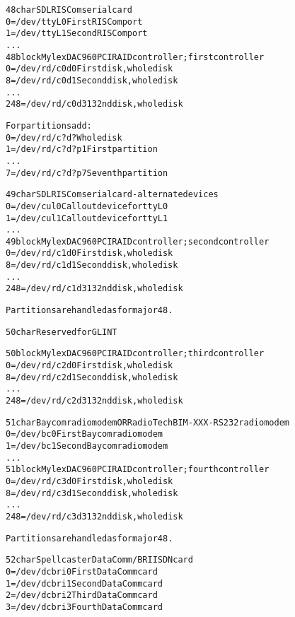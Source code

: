 \documentclass[a4paper,8pt,english]{sphinxmanual}
\begin{document}
\begin{alltt}
  48 char       SDL RISCom serial card
                  0 = /dev/ttyL0        First RISCom port
                  1 = /dev/ttyL1        Second RISCom port
                    ...
  48 block      Mylex DAC960 PCI RAID controller; first controller
                  0 = /dev/rd/c0d0      First disk, whole disk
                  8 = /dev/rd/c0d1      Second disk, whole disk
                    ...
                248 = /dev/rd/c0d31     32nd disk, whole disk

                For partitions add:
                  0 = /dev/rd/c?d?      Whole disk
                  1 = /dev/rd/c?d?p1    First partition
                    ...
                  7 = /dev/rd/c?d?p7    Seventh partition

  49 char       SDL RISCom serial card - alternate devices
                  0 = /dev/cul0         Callout device for ttyL0
                  1 = /dev/cul1         Callout device for ttyL1
                    ...
  49 block      Mylex DAC960 PCI RAID controller; second controller
                  0 = /dev/rd/c1d0      First disk, whole disk
                  8 = /dev/rd/c1d1      Second disk, whole disk
                    ...
                248 = /dev/rd/c1d31     32nd disk, whole disk

                Partitions are handled as for major 48.

  50 char       Reserved for GLINT

  50 block      Mylex DAC960 PCI RAID controller; third controller
                  0 = /dev/rd/c2d0      First disk, whole disk
                  8 = /dev/rd/c2d1      Second disk, whole disk
                    ...
                248 = /dev/rd/c2d31     32nd disk, whole disk

  51 char       Baycom radio modem OR Radio Tech BIM-XXX-RS232 radio modem
                  0 = /dev/bc0          First Baycom radio modem
                  1 = /dev/bc1          Second Baycom radio modem
                    ...
  51 block      Mylex DAC960 PCI RAID controller; fourth controller
                  0 = /dev/rd/c3d0      First disk, whole disk
                  8 = /dev/rd/c3d1      Second disk, whole disk
                    ...
                248 = /dev/rd/c3d31     32nd disk, whole disk

                Partitions are handled as for major 48.

  52 char       Spellcaster DataComm/BRI ISDN card
                  0 = /dev/dcbri0       First DataComm card
                  1 = /dev/dcbri1       Second DataComm card
                  2 = /dev/dcbri2       Third DataComm card
                  3 = /dev/dcbri3       Fourth DataComm card


\end{alltt}
\end{document}
